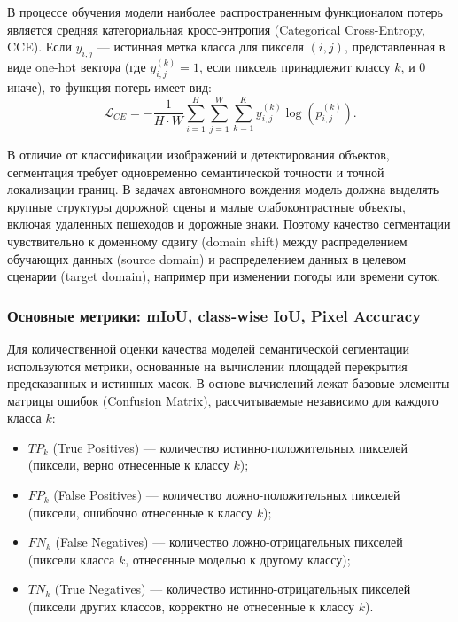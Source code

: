 \documentclass[14pt,a4paper]{extarticle}
\begin{document}
В процессе обучения модели наиболее распространенным функционалом потерь является средняя категориальная кросс-энтропия (Categorical Cross-Entropy, CCE). Если $y_{i,j}$ --- истинная метка класса для пикселя $(i, j)$, представленная в виде one-hot вектора (где $y_{i,j}^{(k)} = 1$, если пиксель принадлежит классу $k$, и $0$ иначе), то функция потерь имеет вид:
\begin{equation}
    \mathcal{L}_{CE} = - \frac{1}{H \cdot W} \sum_{i=1}^{H} \sum_{j=1}^{W} \sum_{k=1}^{K} y_{i,j}^{(k)} \log\left(p_{i,j}^{(k)}\right).
\end{equation}

В отличие от классификации изображений и детектирования объектов, сегментация требует одновременно семантической точности и точной локализации границ. В задачах автономного вождения модель должна выделять крупные структуры дорожной сцены и малые слабоконтрастные объекты, включая удаленных пешеходов и дорожные знаки. Поэтому качество сегментации чувствительно к доменному сдвигу (domain shift) между распределением обучающих данных (source domain) и распределением данных в целевом сценарии (target domain), например при изменении погоды или времени суток.

\subsubsection{Основные метрики: mIoU, class-wise IoU, Pixel Accuracy}
Для количественной оценки качества моделей семантической сегментации используются метрики, основанные на вычислении площадей перекрытия предсказанных и истинных масок. В основе вычислений лежат базовые элементы матрицы ошибок (Confusion Matrix), рассчитываемые независимо для каждого класса $k$:
\begin{itemize}
    \item $TP_k$ (True Positives) --- количество истинно-положительных пикселей (пиксели, верно отнесенные к классу $k$);
    \item $FP_k$ (False Positives) --- количество ложно-положительных пикселей (пиксели, ошибочно отнесенные к классу $k$);
    \item $FN_k$ (False Negatives) --- количество ложно-отрицательных пикселей (пиксели класса $k$, отнесенные моделью к другому классу);
    \item $TN_k$ (True Negatives) --- количество истинно-отрицательных пикселей (пиксели других классов, корректно не отнесенные к классу $k$).
\end{itemize}
\end{document}
